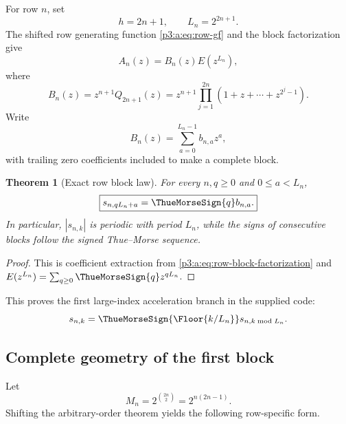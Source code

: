 \documentclass[11pt,oneside]{article}
\numberwithin{equation}{section}
\newtheorem{theorem}{Theorem}[section]
\theoremstyle{definition}
\theoremstyle{remark}
\begin{document}
For row \(n\), set
\begin{equation}
 h=2n+1,
 \qquad
 L_n=2^{2n+1}.
 \label{p3:a:eq:row-h-L}
\end{equation}
The shifted row generating function \eqref{p3:a:eq:row-gf} and the block
factorization give
\begin{equation}
 A_n(z)=B_n(z)E(z^{L_n}),
 \label{p3:a:eq:row-block-factorization}
\end{equation}
where
\begin{equation}
 \boxed{
 B_n(z)=z^{n+1}Q_{2n+1}(z)
 =z^{n+1}\prod_{j=1}^{2n}
 (1+z+\cdots+z^{2^j-1}).}
 \label{p3:a:eq:Bn-definition}
\end{equation}
Write
\begin{equation}
 B_n(z)=\sum_{a=0}^{L_n-1}b_{n,a}z^a,
 \label{p3:a:eq:bna-definition}
\end{equation}
with trailing zero coefficients included to make a complete block.

\begin{theorem}[Exact row block law]
For every \(n,q\ge0\) and \(0\le a<L_n\),
\begin{equation}
 \boxed{s_{n,qL_n+a}=\ThueMorseSign{q} b_{n,a}.}
 \label{p3:a:eq:row-signed-block}
\end{equation}
In particular, \(|s_{n,k}|\) is periodic with period \(L_n\), while the signs
of consecutive blocks follow the signed Thue--Morse sequence.
\end{theorem}

\begin{proof}
This is coefficient extraction from
\eqref{p3:a:eq:row-block-factorization} and
\(E(z^{L_n})=\sum_{q\ge0}\ThueMorseSign{q}z^{qL_n}\).
\end{proof}

This proves the first large-index acceleration branch in the supplied code:
\[
 s_{n,k}=\ThueMorseSign{\Floor{k/L_n}}
 s_{n,k\bmod L_n}.
\]

\subsection{Complete geometry of the first block}

Let
\begin{equation}
 M_n=2^{\binom{2n}{2}}=2^{n(2n-1)}.
 \label{p3:a:eq:Mn-definition}
\end{equation}
Shifting the arbitrary-order theorem yields the following row-specific form.
\end{document}
